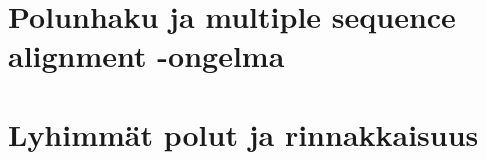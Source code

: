 \documentclass[finnish]{tktltiki2}
\theoremstyle{definition}
\theoremstyle{remark}
\begin{document}
\section{Polunhaku ja multiple sequence alignment -ongelma}

\section{Lyhimmät polut ja rinnakkaisuus}







% 
\end{document}
